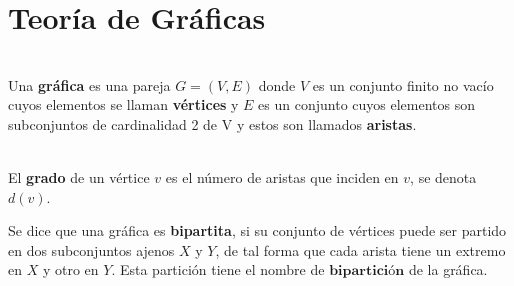 \chapter{Teoría de Gráficas}

\begin{dfn} \cite{Yo} \\
Una \textbf{gráfica} es una pareja $G = (V, E)$ donde $V$ es un conjunto finito no vacío
cuyos elementos se llaman \textbf{vértices} y $E$ es un conjunto cuyos elementos son subconjuntos de
cardinalidad 2 de V y estos son llamados \textbf{aristas}.
\end{dfn}

\begin{dfn} \cite{Yo} \\ 
El \textbf{grado} de un vértice $v$ es el número de aristas que inciden en $v$, se denota $d(v)$.
\end{dfn}

\begin{dfn} \cite{Ramon}
Se dice que una gráfica es \textbf{bipartita}, si su conjunto de vértices puede ser partido en dos subconjuntos ajenos $X$ y $Y$, de tal forma que cada arista tiene un extremo en $X$ y otro en $Y$. Esta partición tiene el nombre de $\textbf{bipartición}$ de la gráfica.
\end{dfn}

